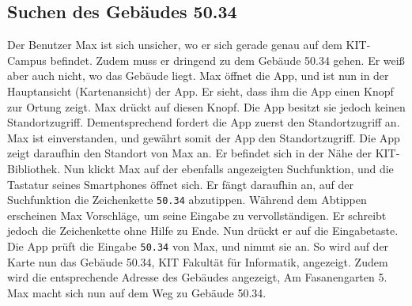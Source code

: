 \subsection{Suchen des Gebäudes 50.34}

Der Benutzer Max ist sich unsicher, wo er sich gerade genau auf dem KIT-Campus befindet.
Zudem muss er dringend zu dem Gebäude 50.34 gehen.
Er weiß aber auch nicht, wo das Gebäude liegt.
Max öffnet die App, und ist nun in der Hauptansicht (Kartenansicht) der App.
Er sieht, dass ihm die App einen Knopf zur Ortung zeigt.
Max drückt auf diesen Knopf.
Die App besitzt sie jedoch keinen Standortzugriff.
Dementsprechend fordert die App zuerst den Standortzugriff an.
Max ist einverstanden, und gewährt somit der App den Standortzugriff.
Die App zeigt daraufhin den Standort von Max an.
Er befindet sich in der Nähe der KIT-Bibliothek.
Nun klickt Max auf der ebenfalls angezeigten Suchfunktion, und die Tastatur seines Smartphones öffnet sich.
Er fängt daraufhin an, auf der Suchfunktion die Zeichenkette \texttt{50.34} abzutippen. 
Während dem Abtippen erscheinen Max Vorschläge, um seine Eingabe zu vervollständigen. 
Er schreibt jedoch die Zeichenkette ohne Hilfe zu Ende. 
Nun drückt er auf die Eingabetaste. 
Die App prüft die Eingabe \texttt{50.34} von Max, und nimmt sie an. 
So wird auf der Karte nun das Gebäude 50.34, KIT Fakultät für Informatik, angezeigt. 
Zudem wird die entsprechende Adresse des Gebäudes angezeigt, \glqq Am Fasanengarten 5\grqq. 
Max macht sich nun auf dem Weg zu Gebäude 50.34.